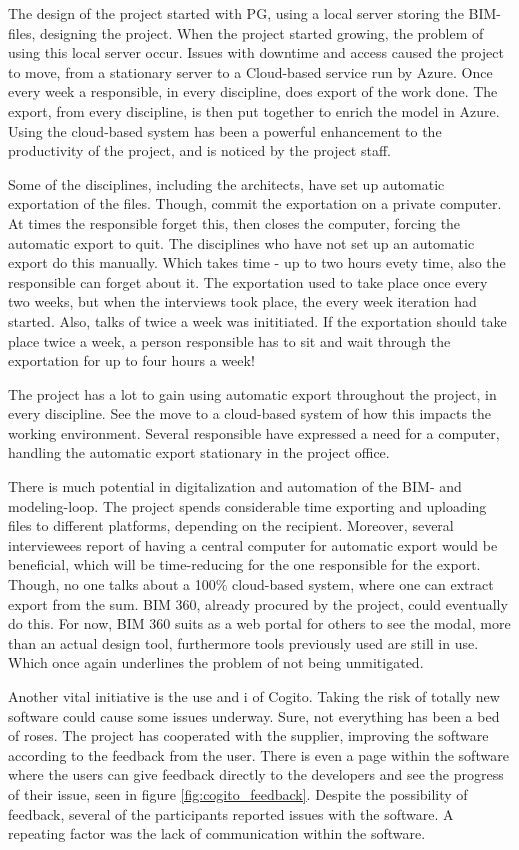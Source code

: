 The design of the project started with PG, using a local server storing the BIM-files, designing the project. When the project started growing, the problem of using this local server occur. Issues with downtime and access caused the project to move, from a stationary server to a Cloud-based service run by Azure. Once every week a responsible, in every discipline, does export of the work done. The export, from every discipline, is then put together to enrich the model in Azure. Using the cloud-based system has been a powerful enhancement to the productivity of the project, and is noticed by the project staff. 

Some of the disciplines, including the architects, have set up automatic exportation of the files. Though, commit the exportation on a private computer. At times the responsible forget this, then closes the computer, forcing the automatic export to quit. The disciplines who have not set up an automatic export do this manually. Which takes time - up to two hours evety time, also the responsible can forget about it. The exportation used to take place once every two weeks, but when the interviews took place, the every week iteration had started. Also, talks of twice a week was inititiated. If the exportation should take place twice a week, a person responsible has to sit and wait through the exportation for up to four hours a week!  

The project has a lot to gain using automatic export throughout the project, in every discipline. See the move to a cloud-based system of how this impacts the working environment. Several responsible have expressed a need for a computer, handling the automatic export stationary in the project office. 

There is much potential in digitalization and automation of the BIM- and modeling-loop. The project spends considerable time exporting and uploading files to different platforms, depending on the recipient. Moreover, several interviewees report of having a central computer for automatic export would be beneficial, which will be time-reducing for the one responsible for the export. Though, no one talks about a 100\% cloud-based system, where one can extract export from the sum. BIM 360, already procured by the project, could eventually do this. For now, BIM 360 suits as a web portal for others to see the modal, more than an actual design tool, furthermore tools previously used are still in use. Which once again underlines the problem of not being unmitigated.

Another vital initiative is the use and i of Cogito. Taking the risk of totally new software could cause some issues underway. Sure, not everything has been a bed of roses. The project has cooperated with the supplier, improving the software according to the feedback from the user. There is even a page within the software where the users can give feedback directly to the developers and see the progress of their issue, seen in figure \ref{fig:cogito_feedback}. Despite the possibility of feedback, several of the participants reported issues with the software. A repeating factor was the lack of communication within the software. 

